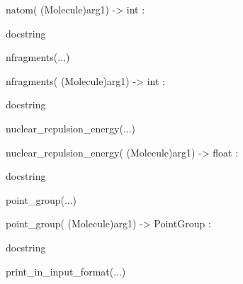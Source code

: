\documentclass[letterpaper,10pt,english]{sphinxmanual}
\begin{document}
\begin{description}
\begin{description}
\begin{DUlineblock}{0em}
\begin{DUlineblock}{\DUlineblockindent}
\item[] natom( (Molecule)arg1) -\textgreater{} int :
\item[]
\begin{DUlineblock}{\DUlineblockindent}
\item[] docstring
\item[] 
\end{DUlineblock}
\end{DUlineblock}
\item[] nfragments(...)
\item[]
\begin{DUlineblock}{\DUlineblockindent}
\item[] nfragments( (Molecule)arg1) -\textgreater{} int :
\item[]
\begin{DUlineblock}{\DUlineblockindent}
\item[] docstring
\item[] 
\end{DUlineblock}
\end{DUlineblock}
\item[] nuclear\_repulsion\_energy(...)
\item[]
\begin{DUlineblock}{\DUlineblockindent}
\item[] nuclear\_repulsion\_energy( (Molecule)arg1) -\textgreater{} float :
\item[]
\begin{DUlineblock}{\DUlineblockindent}
\item[] docstring
\item[] 
\end{DUlineblock}
\end{DUlineblock}
\item[] point\_group(...)
\item[]
\begin{DUlineblock}{\DUlineblockindent}
\item[] point\_group( (Molecule)arg1) -\textgreater{} PointGroup :
\item[]
\begin{DUlineblock}{\DUlineblockindent}
\item[] docstring
\item[] 
\end{DUlineblock}
\end{DUlineblock}
\item[] print\_in\_input\_format(...)
\item[]

\end{DUlineblock}
\end{description}
\end{description}
\end{document}
